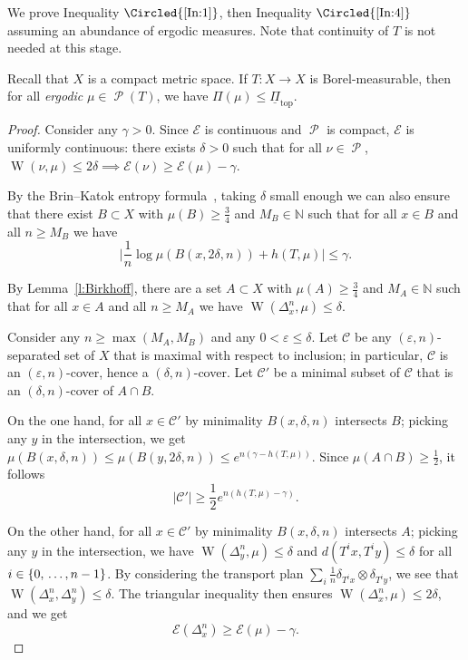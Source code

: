 \documentclass[AHL, Unicode, longabstracts,published]{cedram}
\theoremstyle{plain}
\theoremstyle{plain}
\newcommand\eps{\varepsilon}
\newcommand\NLP{\Pi}
\renewcommand\top{{\mathrm{top}}}
\newcommand{\wass}{\operatorname{W}}
\newcommand\Prob{{\operatorname{\mathscr{P}}}}
\newcounter{In}
\newcommand{\Inref}[1]{\Circled{\ref{#1}}}
\newcommand*\8{\infty}
\newcommand\NN{\mathbb{N}}
\newcommand{\En}{\mathcal{E}}
\newcommand{\cC}{\mathcal C}
\begin{document}
We prove Inequality $\Inref{In:1}$, then Inequality $\Inref{In:4}$ {assuming an abundance of ergodic measures.} Note that continuity of $T$ is not needed at this stage.

\begin{prop}[Inequality \Inref{In:1}]\label{prop:upper-ergodic}
Recall that $X$ is a compact metric space. If $T:X\to X$ is Borel-measurable, then for all \emph{ergodic} $\mu\in\Prob(T)$, we have $\NLP(\mu)\le \underline{\Pi}_\top$.
\end{prop}

\begin{proof}
Consider any $\gamma>0$. Since $\En$ is continuous and $\Prob$ is compact, $\En$ is uniformly continuous: there exists $\delta>0$ such that for all $\nu\in\Prob$, $\wass(\nu,\mu)\le 2\delta \implies \En(\nu)\ge \En(\mu)-\gamma$.

By the Brin--Katok entropy formula~\cite{Brin-Katok}, taking $\delta$ small enough we can also ensure that there exist $B\subset X$ with $\mu(B)\ge \frac34$ and $M_B\in\NN$ such that for all $x\in B$ and all $n\ge M_B$ we have
\[
\Big\lvert \frac1n \log \mu(B(x,2\delta,n)) + h(T,\mu) \Big\rvert \le \gamma.
\]

By Lemma~\ref{l:Birkhoff}, there are a set $A\subset X$ with $\mu(A)\ge\frac34$ and $M_A\in\NN$ such that for all $x\in A$ and all $n\ge M_A$ we have $\wass(\Delta_x^n,\mu)\le \delta$.



Consider any $n\ge\max(M_A,M_B)$ and any $0<\varepsilon\le\delta$. Let $\cC$ be any $(\varepsilon,n)$-separated set of $X$ that is maximal with respect to inclusion; in particular, $\cC$ is an $(\eps,n)$-cover, hence a $(\delta,n)$-cover. Let $\cC'$ be a minimal subset of $\cC$ that is an $(\delta,n)$-cover of $A\cap B$.

On the one hand, for all $x\in \cC'$ by minimality $B(x,\delta,n)$ intersects $B$; picking any $y$ in the intersection, we get $\mu(B(x,\delta,n)) \le \mu(B(y,2\delta,n)) \le e^{n(\gamma-h(T,\mu))}$. Since $\mu(A\cap B)\ge \frac12$, it follows
\[
\lvert \cC'\rvert \ge \frac12 e^{n(h(T,\mu)-\gamma)}.
\]

On the other hand, for all $x\in \cC'$ by minimality $B(x,\delta,n)$ intersects $A$; picking any $y$ in the intersection, we have $\wass(\Delta_y^n,\mu)\le \delta$ and $d(T^i x,T^iy)\le \delta$ for all $i\in \{0,\,\dots,\linebreak n-1\}$. By considering the transport plan $\sum_i \frac1n \delta_{T^i x} \otimes \delta_{T^i y}$, we see that $\wass(\Delta_x^n,\Delta_y^n)\le \delta$. The triangular inequality then ensures $\wass(\Delta_x^n,\mu)\le 2\delta$, and we get
\[
\En(\Delta_x^n)\ge \En(\mu)-\gamma.
\]


\end{proof}
\end{document}
